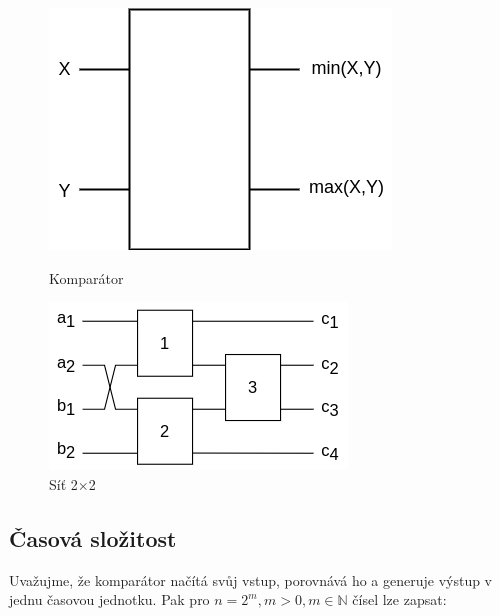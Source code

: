 \documentclass[12pt,a4paper]{article}
\begin{document}
\begin{figure}[H]
\centering
    \begin{minipage}{.45\textwidth}
        \centering
        \includegraphics[width=.9\textwidth]{img/comparator.png}
        \caption{Komparátor}
        \label{fig:net1x1}
    \end{minipage}
    \hfill
    \begin{minipage}{.5\textwidth}
        \centering
        \includegraphics[width=.9\textwidth]{img/net2x2.png}
        \caption{Síť 2$\times$2}
        \label{fig:net2x2}
    \end{minipage}
\end{figure}

\subsection*{Časová složitost}
\label{sub:casova_slozitost}
Uvažujme, že komparátor načítá svůj vstup, porovnává ho a generuje výstup v jednu časovou jednotku. 
Pak pro $n = 2^m, m > 0, m \in \mathbb{N}$ čísel lze zapsat:
\end{document}
